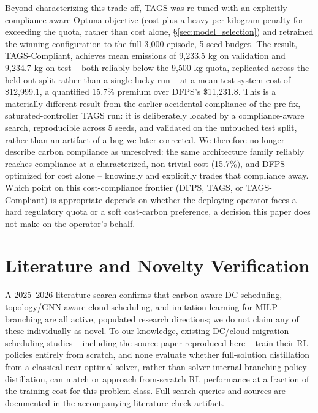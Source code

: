 \documentclass[journal]{IEEEtran}
\begin{document}
Beyond characterizing this trade-off, TAGS was re-tuned with an explicitly compliance-aware Optuna objective (cost plus a heavy per-kilogram penalty for exceeding the quota, rather than cost alone, \S\ref{sec:model_selection}) and retrained the winning configuration to the full 3{,}000-episode, 5-seed budget. The result, TAGS-Compliant, achieves mean emissions of 9{,}233.5 kg on validation and 9{,}234.7 kg on test -- both reliably below the 9{,}500 kg quota, replicated across the held-out split rather than a single lucky run -- at a mean test system cost of \$12{,}999.1, a quantified 15.7\% premium over DFPS's \$11{,}231.8. This is a materially different result from the earlier accidental compliance of the pre-fix, saturated-controller TAGS run: it is deliberately located by a compliance-aware search, reproducible across 5 seeds, and validated on the untouched test split, rather than an artifact of a bug we later corrected. We therefore no longer describe carbon compliance as unresolved: the same architecture family reliably reaches compliance at a characterized, non-trivial cost (15.7\%), and DFPS -- optimized for cost alone -- knowingly and explicitly trades that compliance away. Which point on this cost-compliance frontier (DFPS, TAGS, or TAGS-Compliant) is appropriate depends on whether the deploying operator faces a hard regulatory quota or a soft cost-carbon preference, a decision this paper does not make on the operator's behalf.

\section{Literature and Novelty Verification}
\label{sec:novelty_note}
A 2025--2026 literature search confirms that carbon-aware DC scheduling, topology/GNN-aware cloud scheduling, and imitation learning for MILP branching are all active, populated research directions; we do not claim any of these individually as novel. To our knowledge, existing DC/cloud migration-scheduling studies -- including the source paper reproduced here -- train their RL policies entirely from scratch, and none evaluate whether full-solution distillation from a classical near-optimal solver, rather than solver-internal branching-policy distillation, can match or approach from-scratch RL performance at a fraction of the training cost for this problem class. Full search queries and sources are documented in the accompanying literature-check artifact.
\end{document}
